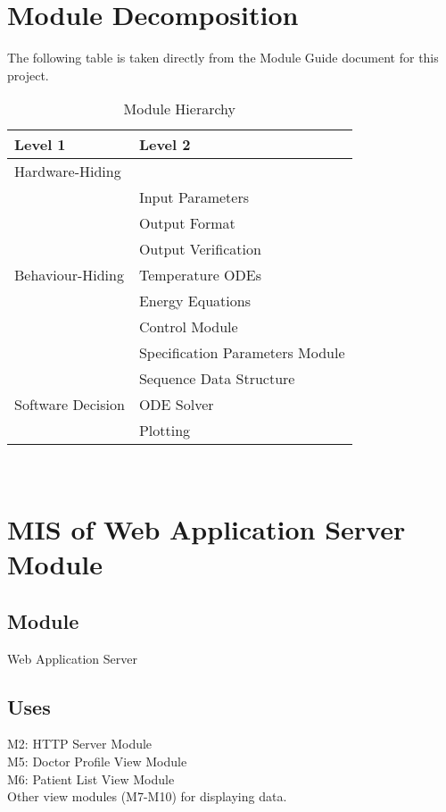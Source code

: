 \documentclass[12pt, titlepage]{article}
\begin{document}
\section{Module Decomposition}

The following table is taken directly from the Module Guide document for this project.

\begin{table}[h!]
\centering
\begin{tabular}{p{} p{}}
\toprule
\textbf{Level 1} & \textbf{Level 2}\\
\midrule

{Hardware-Hiding} & ~ \\
\midrule

\multirow{7}{0.3\textwidth}{Behaviour-Hiding} & Input Parameters\\
& Output Format\\
& Output Verification\\
& Temperature ODEs\\
& Energy Equations\\ 
& Control Module\\
& Specification Parameters Module\\
\midrule

\multirow{3}{0.3\textwidth}{Software Decision} & {Sequence Data Structure}\\
& ODE Solver\\
& Plotting\\
\bottomrule

\end{tabular}
\caption{Module Hierarchy}
\label{TblMH}
\end{table}

\newpage
~\newpage

\section{MIS of Web Application Server Module} 

\subsection{Module}
Web Application Server   
\subsection{Uses}
M2: HTTP Server Module \\ 
M5: Doctor Profile View Module \\ 
M6: Patient List View Module \\ 
Other view modules (M7-M10) for displaying data.\\ 
\end{document}
